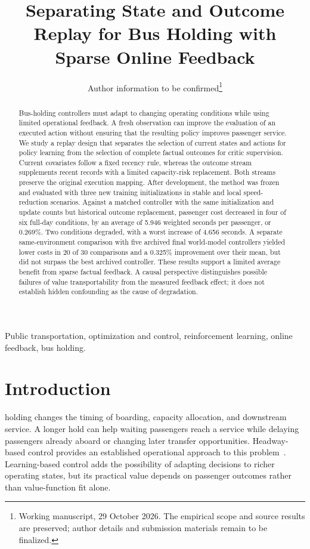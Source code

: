 \documentclass[journal]{IEEEtran}
\title{Separating State and Outcome Replay for Bus Holding with Sparse Online Feedback}
\author{Author information to be confirmed\thanks{Working manuscript, 29 October 2026. The empirical scope and source results are preserved; author details and submission materials remain to be finalized.}}
\begin{document}
\maketitle

\begin{abstract}
Bus-holding controllers must adapt to changing operating conditions while using limited operational feedback. A fresh observation can improve the evaluation of an executed action without ensuring that the resulting policy improves passenger service. We study a replay design that separates the selection of current states and actions for policy learning from the selection of complete factual outcomes for critic supervision. Current covariates follow a fixed recency rule, whereas the outcome stream supplements recent records with a limited capacity-risk replacement. Both streams preserve the original execution mapping. After development, the method was frozen and evaluated with three new training initializations in stable and local speed-reduction scenarios. Against a matched controller with the same initialization and update counts but historical outcome replacement, passenger cost decreased in four of six full-day conditions, by an average of 5.946 weighted seconds per passenger, or 0.269\%. Two conditions degraded, with a worst increase of 4.656 seconds. A separate same-environment comparison with five archived final world-model controllers yielded lower costs in 20 of 30 comparisons and a 0.325\% improvement over their mean, but did not surpass the best archived controller. These results support a limited average benefit from sparse factual feedback. A causal perspective distinguishes possible failures of value transportability from the measured feedback effect; it does not establish hidden confounding as the cause of degradation.
\end{abstract}
\begin{IEEEkeywords}
Public transportation, optimization and control, reinforcement learning, online feedback, bus holding.
\end{IEEEkeywords}

\section{Introduction}
 holding changes the timing of boarding, capacity allocation, and downstream service. A longer hold can help waiting passengers reach a service while delaying passengers already aboard or changing later transfer opportunities. Headway-based control provides an established operational approach to this problem~\cite{daganzo2009}. Learning-based control adds the possibility of adapting decisions to richer operating states, but its practical value depends on passenger outcomes rather than value-function fit alone.
\end{document}
